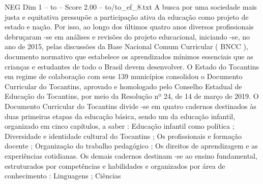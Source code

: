 \begin{textsample}{NEG Dim 1 – to – Score 2.00 – to/to\_ef\_8.txt}  \label{ex:f1_neg_035}
A busca por uma sociedade mais justa e equitativa pressupõe a participação ativa da educação como projeto de estado e nação.
Por isso, ao longo dos últimos quatro anos diversos profissionais debruçaram -se em análises e revisões do projeto educacional, iniciando -se, no ano de 2015, pelas discussões da Base Nacional Comum Curricular ( BNCC ), documento normativo que estabelece os aprendizados mínimos essenciais que as crianças e estudantes de todo o Brasil devem desenvolver.
O Estado do Tocantins em regime de colaboração com seus 139 municípios consolidou o Documento Curricular do Tocantins, aprovado e homologado pelo Conselho Estadual de Educação do Tocantins, por meio da Resolução nº 24, de 14 de março de 2019.
O Documento Curricular do Tocantins divide -se em quatro cadernos destinados às duas primeiras etapas da educação básica, sendo um da educação infantil, organizado em cinco capítulos, a saber : Educação infantil como política ; Diversidade e identidade cultural do Tocantins ; Os profissionais e formação docente ; Organização do trabalho pedagógico ; Os direitos de aprendizagem e as experiências cotidianas.
Os demais cadernos destinam -se ao ensino fundamental, estruturados por competências e habilidades e organizados por área de conhecimento : Linguagens ; Ciências

\end{textsample}
